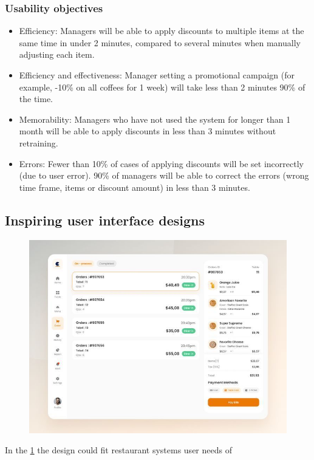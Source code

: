 \documentclass{article}
\begin{document}
\subsubsection{Usability objectives}
\begin{itemize}
    \item Efficiency: Managers will be able to apply discounts to multiple items at the same time in under 2 minutes, compared to several minutes when manually adjusting each item.
    \item Efficiency and effectiveness: Manager setting a promotional campaign (for example, -10\% on all coffees for 1 week) will take less than 2 minutes 90\% of the time.
    \item Memorability: Managers who have not used the system for longer than 1 month will be able to apply discounts in less than 3 minutes without retraining.
    \item Errors: Fewer than 10\% of cases of applying discounts will be set incorrectly (due to user error). 90\% of managers will be able to correct the errors (wrong time frame, items or discount amount) in less than 3 minutes.
\end{itemize}


\subsection{Inspiring user interface designs}

\begin{figure}[H]
    \centering
    \includegraphics[width=0.9\linewidth]{HCI/images/restaurant_UI_1.jpg}
    \caption{}
    \label{fig:restUI1}
\end{figure}
\noindent
In the \cref{fig:restUI1} the design could fit restaurant systems user needs of
\end{document}
